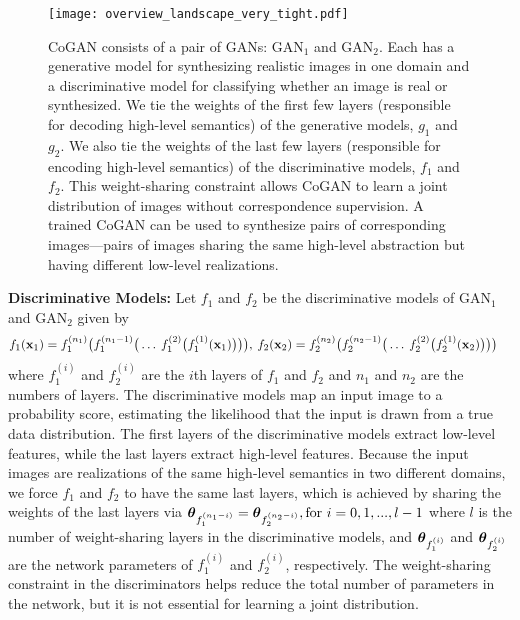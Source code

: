 \documentclass{article}
\begin{document}
\begin{figure}[t!]
\centering
\texttt{[image: overview\_landscape\_very\_tight.pdf]}
\caption{\small CoGAN consists of a pair of GANs: $\text{GAN}_1$ and $\text{GAN}_2$. Each has a generative model for synthesizing realistic images in one domain and a discriminative model for classifying whether an image is real or synthesized. We tie the weights of the first few layers (responsible for decoding high-level semantics) of the generative models, $g_1$ and $g_2$. We also tie the weights of the last few layers (responsible for encoding high-level semantics) of the discriminative models, $f_1$ and $f_2$. This weight-sharing constraint allows CoGAN to learn a joint distribution of images without correspondence supervision. A trained CoGAN can be used to synthesize pairs of corresponding images---pairs of images sharing the same high-level abstraction but having different low-level realizations.}
\label{fig::DGAN}
\end{figure}

{\bf Discriminative Models: }
Let $f_1$ and $f_2$ be the discriminative models of $\text{GAN}_1$ and $\text{GAN}_2$ given by
\begin{align}
& f_1(\mathbf{x}_1) = f_1^{(n_1)}\big{(}f_1^{(n_1-1)}\big{(}\ldots\medspace f_1^{(2)}\big{(}f_1^{(1)}(\mathbf{x}_1)\big{)}\big{)}\big{)},\medspace
f_2(\mathbf{x}_2) = f_2^{(n_2)}\big{(}f_2^{(n_2-1)}\big{(}\ldots\medspace f_2^{(2)}\big{(}f_2^{(1)}(\mathbf{x}_2)\big{)}\big{)}\big{)}\nonumber
\end{align}
where $f_1^{(i)}$ and $f_2^{(i)}$ are the $i$th layers of $f_1$ and $f_2$ and $n_1$ and $n_2$ are the numbers of layers. The discriminative models map an input image to a probability score, estimating the likelihood that the input is drawn from a true data distribution. The first layers of the discriminative models extract low-level features, while the last layers extract high-level features. Because the input images are realizations of the same high-level semantics in two different domains, we force $f_1$ and $f_2$ to have the same last layers, which is achieved by sharing the weights of the last layers via
$\text{\boldmath$\theta$}_{f_1^{(n_1-i)}}=\text{\boldmath$\theta$}_{f_2^{(n_2-i)}}, \text{for } i=0,1,...,l-1$
where $l$ is the number of weight-sharing layers in the discriminative models, and $\text{\boldmath$\theta$}_{f_1^{(i)}}$ and $\text{\boldmath$\theta$}_{f_2^{(i)}}$ are the network parameters of $f_1^{(i)}$ and $f_2^{(i)}$, respectively. The weight-sharing constraint in the discriminators helps reduce the total number of parameters in the network, but it is not essential for learning a joint distribution.
\end{document}
